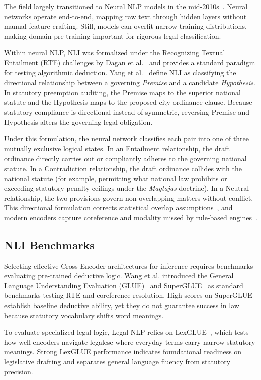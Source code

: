     The field largely transitioned to Neural NLP models in the mid-2010s~\cite{quevedo2024legal}. Neural networks operate end-to-end, mapping raw text through hidden layers without manual feature crafting. Still, models can overfit narrow training distributions, making domain pre-training important for rigorous legal classification.

    Within neural NLP, NLI was formalized under the Recognizing Textual Entailment (RTE) challenges by Dagan et al.~\cite{dagan2006pascal} and provides a standard paradigm for testing algorithmic deduction. Yang et al.~\cite{yang2024improving} define NLI as classifying the directional relationship between a governing \textit{Premise} and a candidate \textit{Hypothesis}. In statutory preemption auditing, the Premise maps to the superior national statute and the Hypothesis maps to the proposed city ordinance clause. Because statutory compliance is directional instead of symmetric, reversing Premise and Hypothesis alters the governing legal obligation.
    
    Under this formulation, the neural network classifies each pair into one of three mutually exclusive logical states. In an Entailment relationship, the draft ordinance directly carries out or compliantly adheres to the governing national statute. In a Contradiction relationship, the draft ordinance collides with the national statute (for example, permitting what national law prohibits or exceeding statutory penalty ceilings under the \textit{Magtajas} doctrine). In a Neutral relationship, the two provisions govern non-overlapping matters without conflict. This directional formulation corrects statistical overlap assumptions~\cite{yang2024improving}, and modern encoders capture coreference and modality missed by rule-based engines~\cite{lehong2023a}.

    \subsection{NLI Benchmarks}
    Selecting effective Cross-Encoder architectures for inference requires benchmarks evaluating pre-trained deductive logic. Wang et al. introduced the General Language Understanding Evaluation (GLUE)~\cite{wang2019glue} and SuperGLUE~\cite{wang2020superglue} as standard benchmarks testing RTE and coreference resolution. High scores on SuperGLUE establish baseline deductive ability, yet they do not guarantee success in law because statutory vocabulary shifts word meanings.

    To evaluate specialized legal logic, Legal NLP relies on LexGLUE~\cite{chalkidis2022lexglue}, which tests how well encoders navigate legalese where everyday terms carry narrow statutory meanings. Strong LexGLUE performance indicates foundational readiness on legislative drafting and separates general language fluency from statutory precision.

